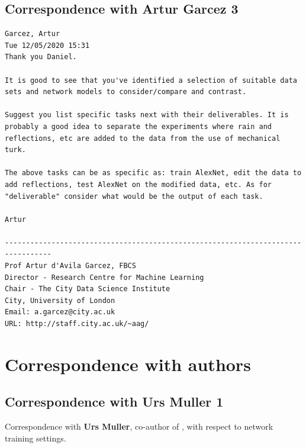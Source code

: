\subsection{Correspondence with Artur Garcez 3}
\label{met:corr_arthur_3}
\begin{verbatim}
Garcez, Artur
Tue 12/05/2020 15:31
Thank you Daniel.

It is good to see that you've identified a selection of suitable data sets and network models to consider/compare and contrast.

Suggest you list specific tasks next with their deliverables. It is probably a good idea to separate the experiments where rain and reflections, etc are added to the data from the use of mechanical turk.

The above tasks can be as specific as: train AlexNet, edit the data to add reflections, test AlexNet on the modified data, etc. As for "deliverable" consider what would be the output of each task.

Artur

---------------------------------------------------------------------------------
Prof Artur d'Avila Garcez, FBCS
Director - Research Centre for Machine Learning
Chair - The City Data Science Institute
City, University of London
Email: a.garcez@city.ac.uk
URL: http://staff.city.ac.uk/~aag/    
\end{verbatim}


\section{Correspondence with authors}
\label{corr_with_authors}

\subsection{Correspondence with Urs Muller 1}
\label{urs_muller1}
Correspondence with \textbf{Urs Muller}, co-author of \cite{bojarski2016end}, with respect to network training settings.

